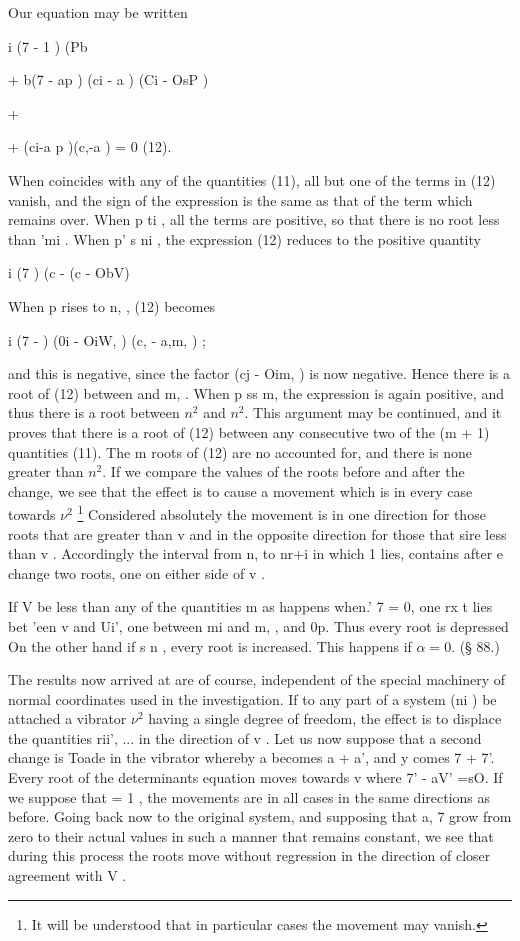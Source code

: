Our equation may be written

 i (7 - 1 ) (Pb

+ b(7 - ap ) (ci - a ) (Ci - OsP )

+

+ (ci-a p )(c,-a ) = 0 (12).

When coincides with any of the quantities (11), all but one of the
terms in (12) vanish, and the sign of the expression is the same as
that of the term which remains over. When p   ti , all the terms are
positive, so that there is no root less than 'mi .  When p’ s ni , the
expression (12) reduces to the positive quantity

 i (7   ) (c - (c - ObV)

When p rises to n, , (12) becomes

 i (7 -  ) (0i - OiW, ) (c, - a,m, ) ;

and this is negative, since the factor (cj - Oim, ) is now negative.
Hence there is a root of (12) between and m, . When p ss m, the
expression is again positive, and thus there is a root between \(n^2\)
and \(n^2\). This argument may be continued, and it proves that there
is a root of (12) between any consecutive two of the (m + 1) quantities
(11). The m roots of (12) are no accounted for, and there is none
greater than \(n^2\). If we compare the values of the roots before and
after the change, we see that the effect is to cause a movement which
is in every case towards \(\nu^2\) \footnote{It will be understood that
in particular cases the movement may vanish.} Considered absolutely the
movement is in one direction for those roots that are greater than v
and in the opposite direction for those that sire less than v .
Accordingly the interval from n, to nr+i in which 1 lies, contains
after e change two roots, one on either side of v .

If V be less than any of the quantities m as happens when.' 7 = 0, one
rx t lies bet 'een v and Ui', one between mi and m, , and 0p. Thus
every root is depressed On the other hand if s   n , every root is
increased. This happens if \(\alpha=0\). (§ 88.)

The results now arrived at are of course, independent of the special
machinery of normal coordinates used in the investigation.  If to any
part of a system (ni ) be attached a vibrator \(\nu^2\) having a single
degree of freedom, the effect is to displace the quantities rii’,
... in the direction of v . Let us now suppose that a second change is
Toade in the vibrator whereby a becomes a + a', and y comes 7 + 7'.
Every root of the determinants equation moves towards v where 7' - aV'
=sO. If we suppose that = 1 , the movements are in all cases in the
same directions as before. Going back now to the original system, and
supposing that a, 7 grow from zero to their actual values in such a
manner that remains constant, we see that during this process the roots
move without regression in the direction of closer agreement with V .


